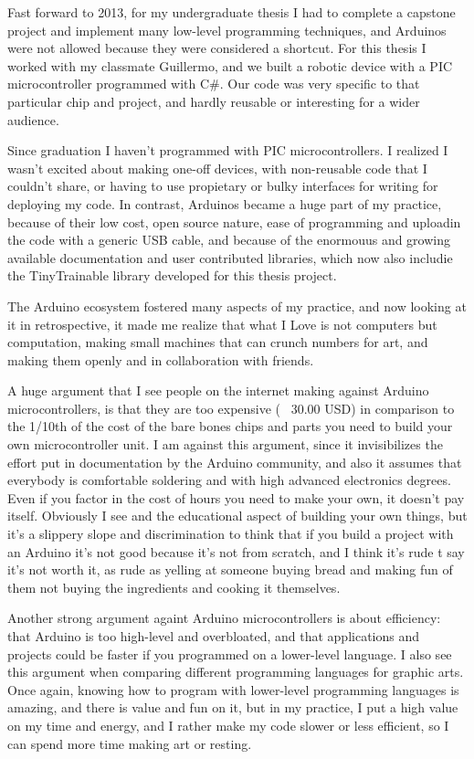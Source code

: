 Fast forward to 2013, for my undergraduate thesis I had to complete a capstone project and implement many low-level programming techniques, and Arduinos were not allowed because they were considered a shortcut. For this thesis I worked with my classmate Guillermo, and we built a robotic device with a \acrshort{PIC} microcontroller programmed with C\#. Our code was very specific to that particular chip and project, and hardly reusable or interesting for a wider audience.

Since graduation I haven't programmed with \acrshort{PIC} microcontrollers. I realized I wasn't excited about making one-off devices, with non-reusable code that I couldn't share, or having to use propietary or bulky interfaces for writing for deploying my code. In contrast, Arduinos became a huge part of my practice, because of their low cost, open source nature, ease of programming and uploadin the code with a generic USB cable, and because of the enormouus and growing available documentation and user contributed libraries, which now also includie the TinyTrainable library developed for this thesis project.

The Arduino ecosystem fostered many aspects of my practice, and now looking at it in retrospective, it made me realize that what I Love is not computers but computation, making small machines that can crunch numbers for art, and making them openly and in collaboration with friends.

A huge argument that I see people on the internet making against Arduino microcontrollers, is that they are too expensive ( ~30.00 USD) in comparison to the 1/10th of the cost of the bare bones chips and parts you need to build your own microcontroller unit. I am against this argument, since it invisibilizes the effort put in documentation by the Arduino community, and also it assumes that everybody is comfortable soldering and with high advanced electronics degrees. Even if you factor in the cost of hours you need to make your own, it doesn't pay itself. Obviously I see and the educational aspect of building your own things, but it's a slippery slope and discrimination to think that if you build a project with an Arduino it's not good because it's not from scratch, and I think it's rude t say it's not worth it, as rude as yelling at someone buying bread and making fun of them not buying the ingredients and cooking it themselves.

Another strong argument againt Arduino microcontrollers is about efficiency: that Arduino is too high-level and overbloated, and that applications and projects could be faster if you programmed on a lower-level language. I also see this argument when comparing different programming languages for graphic arts. Once again, knowing how to program with lower-level programming languages is amazing, and there is value and fun on it, but in my practice, I put a high value on my time and energy, and I rather make my code slower or less efficient, so I can spend more time making art or resting.

